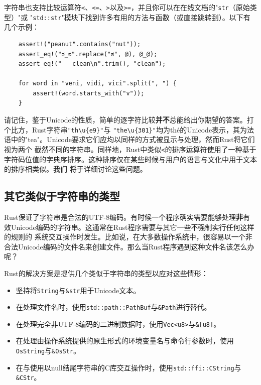 \smallskip
字符串也支持比较运算符\texttt{<}、\texttt{<=}、\texttt{>}以及\texttt{>=}，并且你可以在在线文档的"\texttt{str}（原始类型）"或
"\texttt{std::str}"模块下找到许多有用的方法与函数（或直接跳转到）。以下有几个示例：
\begin{verbatim}
    assert!("peanut".contains("nut"));
    assert_eq!("ಠ_ಠ".replace("ಠ", @), @_@);
    assert_eq!("   clean\n".trim(), "clean");

    for word in "veni, vidi, vici".split(", ") {
        assert!(word.starts_with("v"));
    }
\end{verbatim}

\smallskip
请记住，鉴于Unicode的性质，简单的逐字符比较\textbf{并不}总能给出你期望的答案。打个比方，Rust字符串\texttt{"th{\textbackslash}u\{e9\}"}与
\texttt{"the{\textbackslash}u\{301\}"}均为thé的Unicode表示，其为法语中的"tea"。Unicode要求它们应均以同样的方式被显示与处理，然而Rust将它们视为两个
截然不同的字符串。同样地，Rust中类似\texttt{<}的排序运算符使用了一种基于字符码位值的字典序排序。这种排序仅在某些时候与用户的语言与文化中用于文本的排序相类似。我们
将于详细讨论这些问题。

\medskip
\subsection{其它类似于字符串的类型}
Rust保证了字符串是合法的UTF-8编码。有时候一个程序确实需要能够处理\textbf{非}有效Unicode编码的字符串。这通常在Rust程序需要与其它一些不强制实行任何这样的规则的
系统交互操作时发生。比如说，在大多数操作系统中，很容易以一个非合法Unicode编码的文件名来创建文件。那么当Rust程序遇到这种文件名该怎么办呢？

\medskip
Rust的解决方案是提供几个类似于字符串的类型以应对这些情形：
\begin{itemize}
    \item 坚持将\texttt{String}与\texttt{\&str}用于Unicode文本。
    \item 在处理文件名时，使用\texttt{std::path::PathBuf}与\texttt{\&Path}进行替代。
    \item 在处理完全非UTF-8编码的二进制数据时，使用\texttt{Vec<u8>}与\texttt{\&[u8]}。
    \item 在处理由操作系统提供的原生形式的环境变量名与命令行参数时，使用\texttt{OsString}与\texttt{\&OsStr}。
    \item 在与使用以null结尾字符串的C库交互操作时，使用\texttt{std::ffi::CString}与\texttt{\&CStr}。
\end{itemize}


